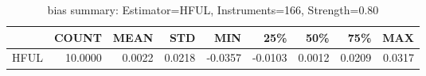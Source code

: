 \begin{table}[ht]
\centering
\caption{bias summary: Estimator=HFUL, Instruments=166, Strength=0.80}
\begin{tabular}{lrrrrrrrr}
\toprule
 & COUNT & MEAN & STD & MIN & 25\% & 50\% & 75\% & MAX \\
\midrule
HFUL & 10.0000 & 0.0022 & 0.0218 & -0.0357 & -0.0103 & 0.0012 & 0.0209 & 0.0317 \\
\bottomrule
\end{tabular}
\end{table}

